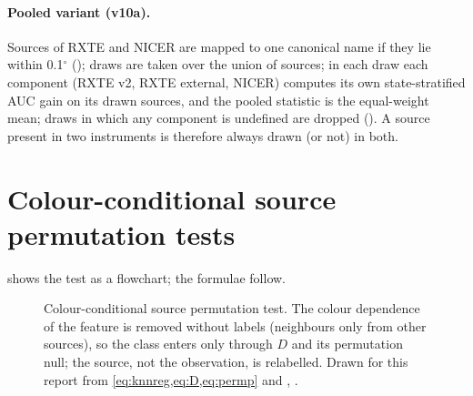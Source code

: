 \paragraph{Pooled variant (v10a).} Sources of RXTE and NICER are mapped to one canonical name if they lie within
0.1$^\circ$ (); draws are taken over the union of sources; in each draw each component
(RXTE v2, RXTE external, NICER) computes its own state-stratified AUC gain on its drawn sources, and the pooled statistic is
the equal-weight mean; draws in which any component is undefined are dropped (). A source
present in two instruments is therefore always drawn (or not) in both.

\section{Colour-conditional source permutation tests}\label{sec:permutation}

 shows the test as a flowchart; the formulae follow.

\begin{figure}[htbp]
\centering

\caption[Colour-conditional permutation test]{Colour-conditional source permutation test. The colour dependence of the feature is
removed without labels (neighbours only from other sources), so the class enters only through $D$ and its permutation null; the
source, not the observation, is relabelled. Drawn for this report from \cref{eq:knnreg,eq:D,eq:permp} and
, .}
\label{fig:permflow}
\end{figure}

